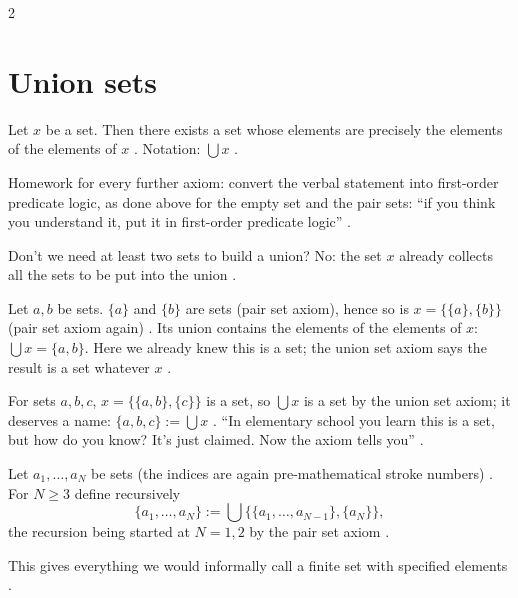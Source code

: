 \begin{paracol}{2}
\section{Union sets}\label{sec:se-union}

\begin{definition}\label{ax:se-union}
Let $x$ be a set. Then there exists a set whose elements are precisely the elements of the elements of $x$
. Notation: $\bigcup x$ .
\end{definition}

\begin{exercise}\label{ex:se-formal}
Homework for every further axiom: convert the verbal statement into first-order predicate logic, as done above for
the empty set and the pair sets: ``if you think you understand it, put it in first-order predicate logic''
.
\end{exercise}

Don't we need at least two sets to build a union? No: the set $x$ already collects all the sets to be put into the
union .

\begin{example}
Let $a,b$ be sets. $\{a\}$ and $\{b\}$ are sets (pair set axiom), hence so is $x=\{\{a\},\{b\}\}$ (pair set axiom
again) . Its union contains the elements of the elements of $x$: $\bigcup x=\{a,b\}$. Here we already
knew this is a set; the union set axiom says the result is a set whatever $x$ .
\end{example}

\begin{example}
For sets $a,b,c$, $x=\{\{a,b\},\{c\}\}$ is a set, so $\bigcup x$ is a set by the union set axiom; it deserves a name:
$\{a,b,c\}:=\bigcup x$ . ``In elementary school you learn this is a set,
but how do you know? It's just claimed. Now the axiom tells you'' .
\end{example}

\begin{definition}\label{def:se-finite}
Let $a_1,\dots,a_N$ be sets (the indices are again pre-mathematical stroke numbers) . For $N\ge3$ define
recursively
\[
  \{a_1,\dots,a_N\}:=\bigcup\bigl\{\{a_1,\dots,a_{N-1}\},\{a_N\}\bigr\},
\]
the recursion being started at $N=1,2$ by the pair set axiom .
\end{definition}
This gives everything we would informally call a finite set with specified elements .


\end{paracol}
